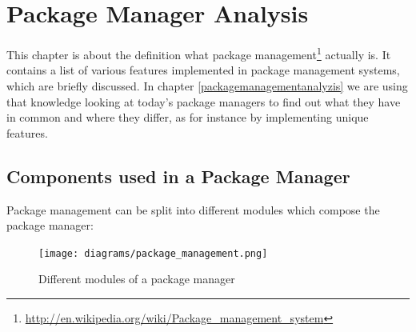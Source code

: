 \documentclass[a4paper,10pt]{article}
\begin{document}
\newpage
\section{Package Manager Analysis}
\label{PackageManagerAnalysis}
This chapter is about the definition what package management\footnote{\url{http://en.wikipedia.org/wiki/Package_management_system}} actually is. It contains a list of various features implemented in package management systems, which are briefly discussed. In chapter \ref{packagemanagementanalyzis} we are using that knowledge looking at today's package managers to find out what they have in common and where they differ, as for instance by implementing unique features.









\subsection{Components used in a Package Manager}
\label{ComponentsUsed}
Package management can be split into different modules which compose the package manager:

\begin{figure}[h]
\caption[Package management]{Different modules of a package manager}
  \centering
\label{fig:package_management}
\texttt{[image: diagrams/package\_management.png]}
\end{figure}
\end{document}
